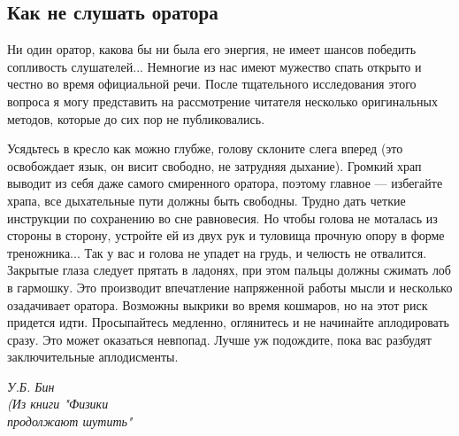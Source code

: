 \begin{multicols}{3}
    \subsection*{Как не слушать оратора}
    \small Ни один оратор, какова бы ни была его энергия, не имеет шансов победить сопливость слушателей... Немногие из нас имеют мужество спать открыто и честно во время официальной речи. После тщательного исследования этого вопроса я могу представить на рассмотрение читателя несколько оригинальных методов, которые до сих пор не публиковались.
    
    Усядьтесь в кресло как можно глубже, голову склоните слега вперед (это освобождает язык, он висит свободно, не затрудняя дыхание). Громкий храп выводит из себя даже самого смиренного оратора, поэтому главное --- избегайте храпа, все дыхательные пути должны быть свободны. Трудно дать четкие инструкции по сохранению во сне равновесия. Но чтобы голова не моталась из стороны в сторону, устройте ей из двух рук и туловища прочную опору в форме треножника... Так у вас и голова не упадет на грудь, и челюсть не отвалится. Закрытые глаза следует прятать в ладонях, при этом пальцы должны сжимать лоб в гармошку. Это производит впечатление напряженной работы мысли и несколько озадачивает оратора. Возможны выкрики во время кошмаров, но на этот риск придется идти. Просыпайтесь медленно, оглянитесь и не начинайте аплодировать сразу. Это может оказаться невпопад. Лучше уж подождите, пока вас разбудят заключительные аплодисменты.
    \begin{flushright}
        {\textit{У.Б. Бин\\(Из книги "Физики\\продолжают шутить"}}
    \end{flushright}
\end{multicols}

